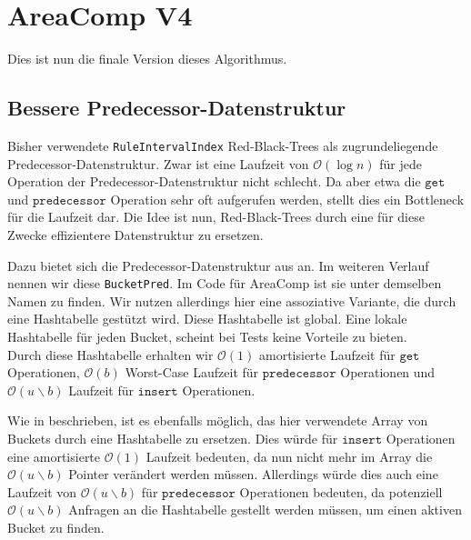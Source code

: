 



\section{AreaComp V4}

Dies ist nun die finale Version dieses Algorithmus. 

\subsection{Bessere Predecessor-Datenstruktur}

Bisher verwendete \texttt{RuleIntervalIndex} Red-Black-Trees als zugrundeliegende Predecessor-Datenstruktur. Zwar ist eine Laufzeit von $\mathcal{O}(\log n)$ für jede Operation der Predecessor-Datenstruktur nicht schlecht. Da aber etwa die $\texttt{get}$ und $\texttt{predecessor}$ Operation sehr oft aufgerufen werden, stellt dies ein Bottleneck für die Laufzeit dar.
Die Idee ist nun, Red-Black-Trees durch eine für diese Zwecke effizientere Datenstruktur zu ersetzen.

Dazu bietet sich die Predecessor-Datenstruktur aus \cite{dinklage_engineering_2021} an. Im weiteren Verlauf nennen wir diese \texttt{BucketPred}. Im Code für AreaComp ist sie unter demselben Namen zu finden. Wir nutzen allerdings hier eine assoziative Variante, die durch eine Hashtabelle gestützt wird. Diese Hashtabelle ist global. 
Eine lokale Hashtabelle für jeden Bucket, scheint bei Tests keine Vorteile zu bieten.\\
Durch diese Hashtabelle erhalten wir $\mathcal{O}(1)$ amortisierte Laufzeit für $\texttt{get}$ Operationen, $\mathcal{O}(b)$ Worst-Case Laufzeit für $\texttt{predecessor}$ Operationen und $\mathcal{O}(u \backslash b)$ Laufzeit für $\texttt{insert}$ Operationen. 

Wie in \cite{dinklage_engineering_2021} beschrieben, ist es ebenfalls möglich, das hier verwendete Array von Buckets durch eine Hashtabelle zu ersetzen. Dies würde für $\texttt{insert}$ Operationen eine amortisierte $\mathcal{O}(1)$ Laufzeit bedeuten, da nun nicht mehr im Array die $\mathcal{O}(u \backslash b)$ Pointer verändert werden müssen. Allerdings würde dies auch eine Laufzeit von $\mathcal{O}(u \backslash b)$ für $\texttt{predecessor}$ Operationen bedeuten, da potenziell $\mathcal{O}(u \backslash b)$ Anfragen an die Hashtabelle gestellt werden müssen, um einen aktiven Bucket zu finden. 

